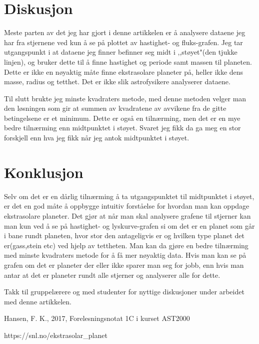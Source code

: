 \documentclass[12pt,preprint]{aastex6}
\begin{document}
\section{Diskusjon}
Meste parten av det jeg har gjort i denne artikkelen er å analysere dataene jeg har fra stjernene ved kun å se på plottet av hastighet- og fluks-grafen. Jeg tar utgangspunkt i at dataene jeg finner befinner seg midt i ,,støyet"(den tjukke linjen), og bruker dette til å finne hastighet og periode samt massen til planeten. Dette er ikke en nøyaktig måte finne ekstrasolare planeter på, heller ikke dens masse, radius og tetthet. Det er ikke slik astrofysikere analyserer dataene.  

Til slutt brukte jeg minste kvadraters metode, med denne metoden velger man den løsningen som gir at summen av kvadratene av avvikene fra de gitte betingelsene er et minimum. Dette er også en tilnærming, men det er en mye bedre tilnærming enn midtpunktet i støyet. Svaret jeg fikk da ga meg en stor forskjell enn hva jeg fikk når jeg antok midtpunktet i støyet. 

\section{Konklusjon}
Selv om det er en dårlig tilnærming å ta utgangspunktet til midtpunktet i støyet, er det en god måte å oppbygge intuitiv forståelse for hvordan man kan oppdage ekstrasolare planeter. Det gjør at når man skal analysere grafene til stjerner kan man kun ved å se på hastighet- og lyskurve-grafen si om det er en planet som går i bane rundt planeten, hvor stor den antageligvis er og hvilken type planet det er(gass,stein etc) ved hjelp av tettheten. Man kan da gjøre en bedre tilnærming med minste kvadraters metode for å få mer nøyaktig data. Hvis man kan se på grafen om det er planeter der eller ikke sparer man seg for jobb, enn hvis man antar at det er planeter rundt alle stjerner og analyserer alle for dette. 

\begin{acknowledgments}
Takk til gruppelærere og med studenter for nyttige diskusjoner under arbeidet med denne artikkelen. 
\end{acknowledgments}




\begin{thebibliography}{}
 Hansen, F. K.,  2017, Forelesningsnotat 1C i kurset AST2000

https://snl.no/ekstrasolar\_planet

\end{thebibliography}
\end{document}
